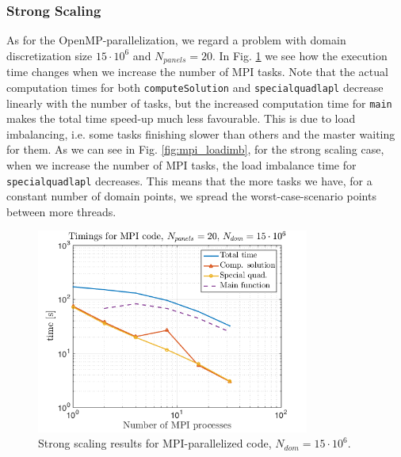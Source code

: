 \documentclass[a4paper,10pt]{article}
\def\code#1{\texttt{#1}}
\begin{document}
\subsubsection*{Strong Scaling}
As for the OpenMP-parallelization, we regard a problem with domain discretization size $15\cdot10^6$ and $N_{panels}=20$. In Fig. \ref{fig:mpi_strongtime} we see how the execution time changes when we increase the number of MPI tasks. Note that the actual computation times for both \code{computeSolution} and \code{specialquadlapl} decrease linearly with the number of tasks, but the increased computation time for \code{main} makes the total time speed-up much less favourable. This is due to load imbalancing, i.e. some tasks finishing slower than others and the master waiting for them. As we can see in Fig. \ref{fig:mpi_loadimb}, for the strong scaling case, when we increase the number of MPI tasks, the load imbalance time for \code{specialquadlapl} decreases. This means that the more tasks we have, for a constant number of domain points, we spread the worst-case-scenario points between more threads. 
\begin{figure}[ht]
    \begin{center}
        \includegraphics[width=0.8\textwidth]{Graphics/craypat_mpi_strongscaling.png}
    \end{center}
    \caption{Strong scaling results for MPI-parallelized code, $N_{dom}=15\cdot 10^6$.}
    \label{fig:mpi_strongtime}
\end{figure}
\end{document}
